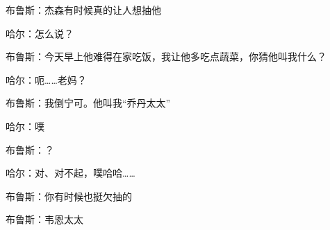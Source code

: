 布鲁斯：杰森有时候真的让人想抽他

哈尔：怎么说？

布鲁斯：今天早上他难得在家吃饭，我让他多吃点蔬菜，你猜他叫我什么？

哈尔：呃……老妈？

布鲁斯：我倒宁可。他叫我“乔丹太太”

哈尔：噗

布鲁斯：？

哈尔：对、对不起，噗哈哈……

布鲁斯：你有时候也挺欠抽的

布鲁斯：韦恩太太